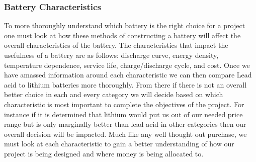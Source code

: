 \subsubsection{Battery Characteristics}
To more thoroughly understand which battery is the right choice for a project one must look at how these methods of constructing a battery will affect the overall characteristics of the battery. The characteristics that impact the usefulness of a battery are as follows: discharge curve, energy density, temperature dependence, service life, charge/discharge cycle, and cost. Once we have amassed information around each characteristic we can then compare Lead acid to lithium batteries more thoroughly. From there if there is not an overall better choice in each and every category we will decide based on which characteristic is most important to complete the objectives of the project. For instance if it is determined that lithium would put us out of our needed price range but is only marginally better than lead acid in other categories then our overall decision will be impacted. Much like any well thought out purchase, we must look at each characteristic to gain a better understanding of how our project is being designed and where money is being allocated to.

